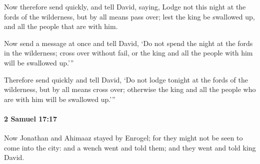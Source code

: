 			\begin{versebox}
					\item[BHS] 
					\item[ASV] Now therefore send quickly, and tell David, saying, Lodge not this night at the fords of the wilderness, but by all means pass over; lest the king be swallowed up, and all the people that are with him.
					\item[NIV] Now send a message at once and tell David, ‘Do not spend the night at the fords in the wilderness; cross over without fail, or the king and all the people with him will be swallowed up.’”
					\item[NRSV] Therefore send quickly and tell David, ‘Do not lodge tonight at the fords of the wilderness, but by all means cross over; otherwise the king and all the people who are with him will be swallowed up.’”
			\end{versebox}

		\paragraph{2 Samuel 17:17} %
			\label{2SAMUEL-17-17}

			Now Jonathan and Ahimaaz stayed by Enrogel; for they might not be seen to come into the city: and a wench went and told them; and they went and told king David.

